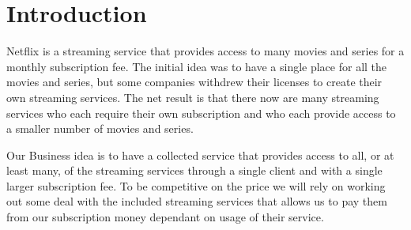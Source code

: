 \section{Introduction}
\label{sec:introduction}
Netflix is a streaming service that provides access to many movies and series for a monthly subscription fee. The initial idea was to have a single place for all the movies and series, but some companies withdrew their licenses to create their own streaming services. The net result is that there now are many streaming services who each require their own subscription and who each provide access to a smaller number of movies and series.

Our Business idea is to have a collected service that provides access to all, or at least many, of the streaming services through a single client and with a single larger subscription fee. To be competitive on the price we will rely on working out some deal with the included streaming services that allows us to pay them from our subscription money dependant on usage of their service.